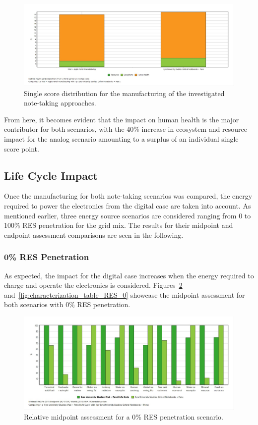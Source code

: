 \begin{figure}[H]
    \centering
    \includegraphics[width=\textwidth]{images/Manufacturing/Single_Score_Manufacturing.JPG}
    \caption{Single score distribution for the manufacturing of the investigated note-taking approaches.}\label{fig:single_score_manufacturing}
\end{figure}

From here, it becomes evident that the impact on human health is the major contributor for both scenarios, with the 40\% increase in ecosystem and resource impact for the analog scenario amounting to a surplus of an individual single score point. 

\subsection{Life Cycle Impact}\label{subsec:results_life_cycle}
Once the manufacturing for both note-taking scenarios was compared, the energy required to power the electronics from the digital case are taken into account. As mentioned earlier, three energy source scenarios are considered ranging from 0 to 100\% RES penetration for the grid mix. The results for their midpoint and endpoint assessment comparisons are seen in the following.

\subsubsection{0\% RES Penetration}\label{subsubsec:0RES}
As expected, the impact for the digital case increases when the energy required to charge and operate the electronics is considered. Figures~\ref{fig:characterization_RES_0} and~\ref{fig:characterization_table_RES_0} showcase the midpoint assessment for both scenarios with 0\% RES penetration.

\begin{figure}[H]
    \centering
    \includegraphics[width=\textwidth]{images/RES_0/Characterization_RES_0.JPG}
    \caption{Relative midpoint assessment for a 0\% RES penetration scenario.}\label{fig:characterization_RES_0}
\end{figure}

